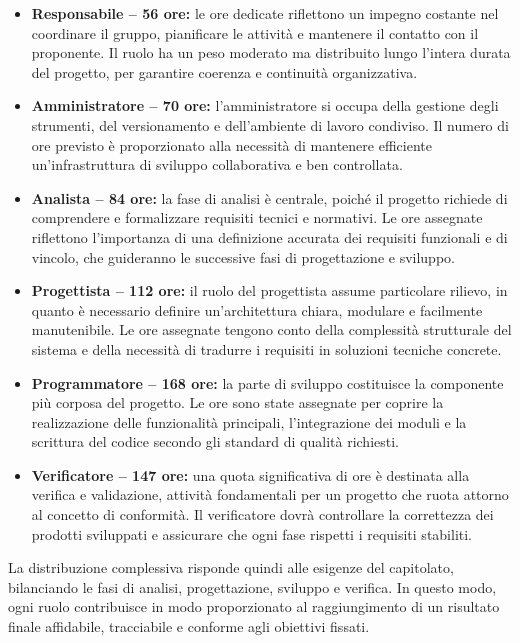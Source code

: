 \documentclass[a4paper,12pt]{article}
\begin{document}
\begin{itemize}
    \item \textbf{Responsabile – 56 ore:} le ore dedicate riflettono un impegno costante nel coordinare il gruppo, pianificare le attività e mantenere il contatto con il proponente. Il ruolo ha un peso moderato ma distribuito lungo l’intera durata del progetto, per garantire coerenza e continuità organizzativa.
    
    \item \textbf{Amministratore – 70 ore:} l’amministratore si occupa della gestione degli strumenti, del versionamento e dell’ambiente di lavoro condiviso. Il numero di ore previsto è proporzionato alla necessità di mantenere efficiente un’infrastruttura di sviluppo collaborativa e ben controllata.
    
    \item \textbf{Analista – 84 ore:} la fase di analisi è centrale, poiché il progetto richiede di comprendere e formalizzare requisiti tecnici e normativi. Le ore assegnate riflettono l’importanza di una definizione accurata dei requisiti funzionali e di vincolo, che guideranno le successive fasi di progettazione e sviluppo.
    
    \item \textbf{Progettista – 112 ore:} il ruolo del progettista assume particolare rilievo, in quanto è necessario definire un’architettura chiara, modulare e facilmente manutenibile. Le ore assegnate tengono conto della complessità strutturale del sistema e della necessità di tradurre i requisiti in soluzioni tecniche concrete.
    
    \item \textbf{Programmatore – 168 ore:} la parte di sviluppo costituisce la componente più corposa del progetto. Le ore sono state assegnate per coprire la realizzazione delle funzionalità principali, l’integrazione dei moduli e la scrittura del codice secondo gli standard di qualità richiesti.
    
    \item \textbf{Verificatore – 147 ore:} una quota significativa di ore è destinata alla verifica e validazione, attività fondamentali per un progetto che ruota attorno al concetto di conformità. Il verificatore dovrà controllare la correttezza dei prodotti sviluppati e assicurare che ogni fase rispetti i requisiti stabiliti.
\end{itemize}

La distribuzione complessiva risponde quindi alle esigenze del capitolato, bilanciando le fasi di analisi, progettazione, sviluppo e verifica.  
In questo modo, ogni ruolo contribuisce in modo proporzionato al raggiungimento di un risultato finale affidabile, tracciabile e conforme agli obiettivi fissati.
\end{document}
